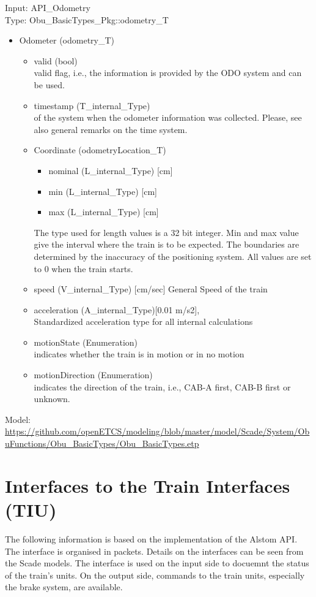 \documentclass{template/openetcs_report}
\begin{document}
Input: API\_Odometry\\
Type: Obu\_BasicTypes\_Pkg::odometry\_T

\begin{itemize}
\item Odometer (odometry\_T)
\begin{itemize}
\item valid (bool)\\
valid flag, i.e., the information is provided by the ODO system and can be used.
\item timestamp (T\_internal\_Type)\\
of the system when the odometer information was collected. Please, see also general remarks on the time system. 
\item Coordinate (odometryLocation\_T)
\begin{itemize}
\item nominal (L\_internal\_Type) [cm]
\item min (L\_internal\_Type) [cm]
\item max (L\_internal\_Type) [cm]
\end{itemize}
The type used for length values is a 32 bit integer. 
Min and max value give the interval where the train is to be expected. The boundaries are determined by the inaccuracy of the positioning system. All values are set to 0 when the train starts.
\item speed (V\_internal\_Type) [cm/sec]
General Speed of the train
\item acceleration (A\_internal\_Type)[0.01 m/s2],\\
Standardized acceleration type for all internal calculations
\item motionState (Enumeration)\\
indicates whether the train is in motion or in no motion
\item motionDirection (Enumeration)\\
indicates the direction of the train, i.e., CAB-A first, CAB-B first or unknown.
\end{itemize}
\end{itemize}

Model: \url{https://github.com/openETCS/modeling/blob/master/model/Scade/System/ObuFunctions/Obu_BasicTypes/Obu_BasicTypes.etp}

\section{Interfaces to the Train Interfaces (TIU)}
The following information is based on the implementation of the Alstom API. The interface is organised in packets. Details on the interfaces can be seen from the Scade models. The interface is used on the input side to docuemnt the status of the train's units. On the output side, commands to the train units, especially the brake system, are available.
\end{document}
